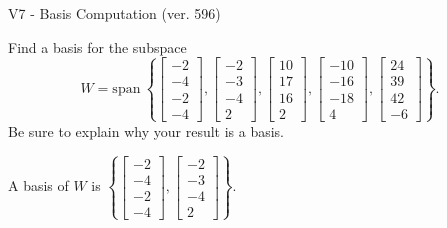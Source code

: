 \begin{exercise}
  \begin{exerciseTitle}V7 - Basis Computation (ver. 596)\end{exerciseTitle}
  \begin{exerciseStatement}
    Find a basis for the subspace 
\[W=\mathrm{span}\ \left\{\left[\begin{array}{r}
-2 \\
-4 \\
-2 \\
-4
\end{array}\right] , \left[\begin{array}{r}
-2 \\
-3 \\
-4 \\
2
\end{array}\right] , \left[\begin{array}{r}
10 \\
17 \\
16 \\
2
\end{array}\right] , \left[\begin{array}{r}
-10 \\
-16 \\
-18 \\
4
\end{array}\right] , \left[\begin{array}{r}
24 \\
39 \\
42 \\
-6
\end{array}\right]\right\}.\]
 Be sure to explain why your result is a basis.


  \end{exerciseStatement}
  \begin{exerciseAnswer}
   A basis of \(W\) is  \(\left\{\left[\begin{array}{r}
-2 \\
-4 \\
-2 \\
-4
\end{array}\right] , \left[\begin{array}{r}
-2 \\
-3 \\
-4 \\
2
\end{array}\right]\right\}\).
  


  \end{exerciseAnswer}
\end{exercise}